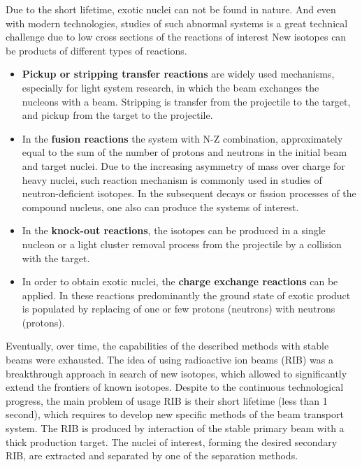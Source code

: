 Due to the short lifetime, exotic nuclei can not be found in nature.
And even with modern technologies, studies of such abnormal systems is a great technical challenge due to low cross sections of the reactions of interest
New isotopes can be products of different types of reactions.
\begin{itemize}
	\item 
	\textbf{Pickup or stripping transfer reactions} are widely used mechanisms, especially for light system research, in which the beam exchanges the nucleons with a beam. 
	Stripping is transfer from the projectile to the target, and pickup from the target to the projectile.
	
	\item 
	In the \textbf{fusion reactions} the system with N-Z combination, approximately equal to the sum of the number of protons and neutrons in the initial beam and target nuclei.
	Due to the increasing asymmetry of mass over charge for heavy nuclei, such reaction mechanism is commonly used in studies of neutron-deficient isotopes.	
	In the subsequent decays or fission processes of the compound nucleus, one also can produce the systems of interest. 
	
	\item
	In the \textbf{knock-out reactions}, the isotopes can be produced in a single nucleon or a light cluster removal process from the projectile by a collision with the target.
	
	\item
	In order to obtain exotic nuclei, the \textbf{charge exchange reactions} can be applied.
	In these reactions predominantly  the ground state of exotic product is populated by replacing of one or few protons (neutrons) with neutrons (protons).
	
	
\end{itemize}	

Eventually, over time, the capabilities of the described methods with stable beams were exhausted.
The idea of using radioactive ion beams (RIB) was a breakthrough approach in search of new isotopes, which allowed to significantly extend the frontiers of known isotopes. 
Despite to the continuous technological progress, the main problem of usage RIB is their short lifetime (less than 1 second), which requires to develop new specific methods of the beam transport system.
The RIB is produced by interaction of the stable primary beam with a thick production target.
The nuclei of interest, forming the desired secondary RIB, are extracted and separated by one of the separation methods.

